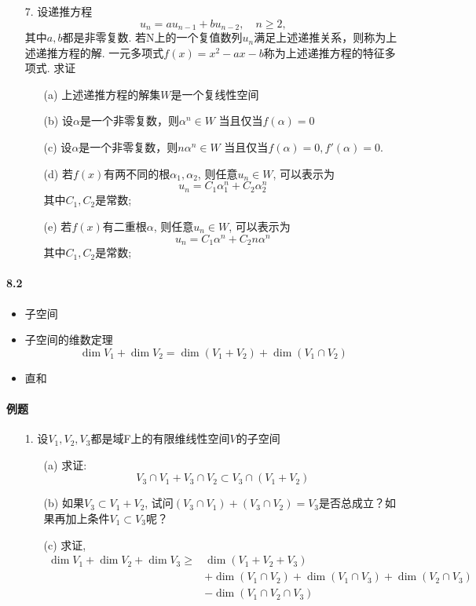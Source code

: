 \begin{itemize}
  \item[7.] 设递推方程
  $$u_n = au_{n-1} +bu_{n-2}, \quad n \ge 2,$$
  其中$a,b$都是非零复数. 若N上的一个复值数列$u_n$满足上述递推关系，则称为上述递推方程的解.
  一元多项式$f(x)=x^2 - ax -b$称为上述递推方程的特征多项式.
  求证
  \begin{itemize}
    \item [(a)] 上述递推方程的解集$W$是一个复线性空间
    \item [(b)] 设$\alpha$是一个非零复数，则$\alpha^n \in W$ 当且仅当$f(\alpha)=0$
    \item [(c)] 设$\alpha$是一个非零复数，则$n\alpha^n \in W$ 当且仅当$f(\alpha)=0, f'(\alpha)=0$.
    \item [(d)] 若$f(x)$有两不同的根$\alpha_1, \alpha_2$, 则任意$u_n \in W$, 可以表示为
    $$ u_n = C_1 \alpha_1^n +C_2 \alpha_2^n$$
    其中$C_1, C_2$是常数;
    \item [(e)] 若$f(x)$有二重根$\alpha$, 则任意$u_n \in W$, 可以表示为
    $$ u_n = C_1 \alpha^n +C_2 n\alpha^n$$
    其中$C_1, C_2$是常数;
  \end{itemize}
\end{itemize}
\vspace{6cm}


\paragraph{8.2}
\begin{itemize}
    \item 子空间
    \item 子空间的维数定理
    $$\dim V_1 + \dim V_2 = \dim (V_1 + V_2) + \dim (V_1 \cap V_2)$$
    \item 直和
\end{itemize}

\paragraph{例题}
\begin{itemize}
\item[1.] 设$V_1, V_2, V_3$都是域F上的有限维线性空间$V$的子空间
\begin{itemize}
    \item[(a)] 求证:
    $$V_3 \cap V_1 + V_3 \cap V_2 \subset V_3 \cap (V_1 + V_2)$$ 
    \item[(b)] 如果$V_3 \subset V_1 + V_2$,
试问$(V_3\cap V_1) + (V_3\cap V_2) = V_3$是否总成立？如果再加上条件$V_1 \subset V_3$呢？
    \item[(c)] 求证,
    \begin{equation}
    \nonumber
    \begin{aligned}
    \dim V_1 + \dim V_2 + \dim V_3 \ge
    &\dim(V_1 + V_2 + V_3)\\
    &+\dim(V_1 \cap V_2) +\dim(V_1 \cap V_3) +\dim(V_2 \cap V_3)\\
    &-\dim(V_1 \cap V_2 \cap V_3)
    \end{aligned}
    \end{equation}  
  \end{itemize}
\end{itemize}
\vspace{3cm}

